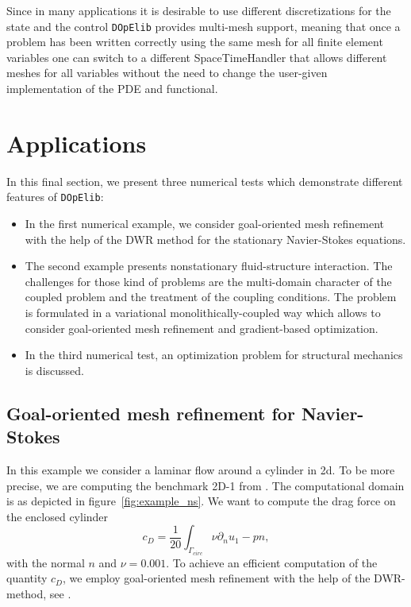 \documentclass[prodmode,acmtoms]{acmsmall}
\numberwithin{equation}{section}
\newcommand{\dope}{\texttt{DOpElib}}
\begin{document}
Since in many applications it is desirable to use different discretizations
for the state and the control \dope{} provides multi-mesh support, meaning that
once a problem has been written correctly using the same mesh for all finite element
variables one can switch to a different SpaceTimeHandler that allows different meshes for all 
variables without the need to change the user-given implementation of the PDE and functional.

\section{Applications}
\label{applications}
In this final section, 
we present three numerical tests which demonstrate different
features of \dope{}:
\begin{itemize}
\item In the first numerical example, we consider 
goal-oriented mesh refinement with the help of the 
DWR method for the stationary Navier-Stokes equations.
\item The second example presents nonstationary fluid-structure 
interaction. The challenges for those kind of problems are the multi-domain
character of the coupled problem and the treatment of the coupling conditions.
The problem is formulated in a variational monolithically-coupled way which 
allows to consider goal-oriented mesh refinement and gradient-based optimization.
\item In the third numerical test, an optimization problem for structural mechanics
is discussed.
\end{itemize}

\subsection{Goal-oriented mesh refinement for Navier-Stokes}
In this example we consider a laminar flow around a cylinder in 2d. To be more precise, we are computing the benchmark 2D-1 from \cite{TuSchae96}. The computational domain is as depicted in figure~\ref{fig:example_ns}. We want to compute the drag force on the enclosed cylinder
\begin{equation}
c_D = \frac 1 {20} \int_{\Gamma_{circ}} \nu\partial_nu _1 - pn,
\end{equation}
with the normal $n$ and $\nu = 0.001$. To achieve an efficient computation of the quantity $c_D$, we employ goal-oriented mesh refinement with the help of the DWR-method, see \cite{BeRa96}.
\end{document}
